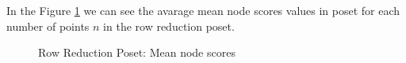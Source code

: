 \documentclass{article}
\begin{document}
\par In the Figure \ref{fig:scores_node_mean_rrp} we can see the avarage mean node scores values in poset for each number of points $n$ in the row reduction poset.
\begin{figure}[ht]
  \vspace{-96pt}
  \centering
  \hspace*{-0.19\textwidth}
  \caption{Row Reduction Poset: Mean node scores}
  \label{fig:scores_node_mean_rrp}
\end{figure}
\end{document}
